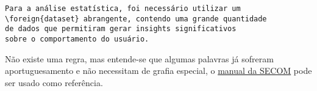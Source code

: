 \begin{lstlisting}[float=htb, style=latexStyle, caption={Estrangeirismos}, label=lst:loanword]
Para a análise estatística, foi necessário utilizar um 
\foreign{dataset} abrangente, contendo uma grande quantidade 
de dados que permitiram gerar insights significativos 
sobre o comportamento do usuário.
\end{lstlisting}

Não existe uma regra, mas entende-se que algumas palavras já sofreram aportuguesamento e não necessitam de grafia especial, o \href{https://www12.senado.leg.br/manualdecomunicacao/verbetes-acessorio/estrangeirismos-grafados-sem-italico-ou-aspas}{manual da SECOM} pode ser usado como referência.

